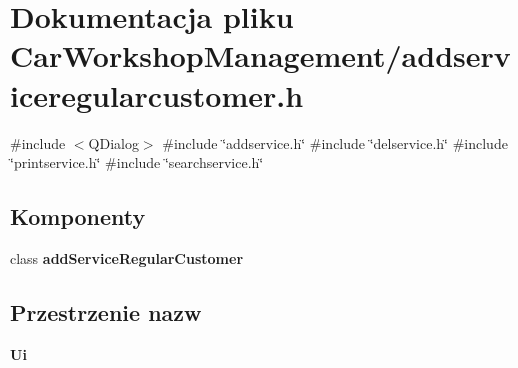 \section{Dokumentacja pliku Car\+Workshop\+Management/addserviceregularcustomer.h}
\label{addserviceregularcustomer_8h}
{\ttfamily \#include $<$Q\+Dialog$>$}\newline
{\ttfamily \#include \char`\"{}addservice.\+h\char`\"{}}\newline
{\ttfamily \#include \char`\"{}delservice.\+h\char`\"{}}\newline
{\ttfamily \#include \char`\"{}printservice.\+h\char`\"{}}\newline
{\ttfamily \#include \char`\"{}searchservice.\+h\char`\"{}}\newline
\subsection*{Komponenty}
\begin{DoxyCompactItemize}
\item 
class \textbf{ add\+Service\+Regular\+Customer}
\end{DoxyCompactItemize}
\subsection*{Przestrzenie nazw}
\begin{DoxyCompactItemize}
\item 
 \textbf{ Ui}
\end{DoxyCompactItemize}
